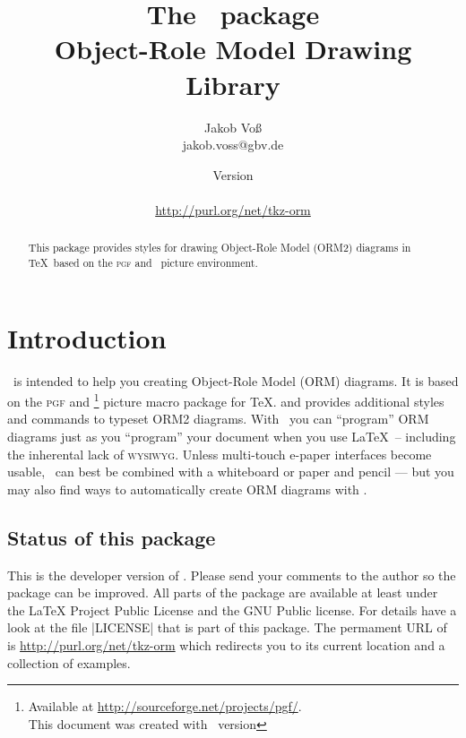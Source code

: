 \documentclass[a4paper,10pt]{article}
\title{The \tkzorm\ package\\Object-Role Model Drawing Library}
\author{Jakob Vo\ss\\{\footnotesize jakob.voss@gbv.de}}
\date{Version \ormVersion\\\ormDate\\[5mm]\url{http://purl.org/net/tkz-orm}}
\begin{document}
\maketitle

\begin{abstract}\noindent
This package provides styles for drawing Object-Role Model (ORM2) diagrams
in \TeX\ based on the \textsc{pgf} and \tikzname\ picture environment.
\end{abstract}

\tableofcontents
\pagebreak

\section{Introduction}
\label{sec:introduction}

\tkzorm\ is intended to help you creating Object-Role Model (ORM) diagrams. It is based on the \textsc{pgf} and \tikzname\footnote{Available at \url{http://sourceforge.net/projects/pgf/}.\\This document was created with \tikzname\ version \pgftypesetversion} picture macro package for \TeX. and provides additional styles and commands to typeset ORM2 diagrams. With \tkzorm\ you can ``program'' ORM diagrams just as you ``program'' your document when you use \LaTeX\ -- including the inherental lack of \textsc{wysiwyg}. Unless multi-touch e-paper interfaces become usable, \tkzorm\ can best be combined with a whiteboard or paper and pencil --- but you may also find ways to automatically create ORM diagrams with \tkzorm.

\subsection*{Status of this package}
This is the developer version of \tkzorm. Please send your comments to the author so the package can be improved. All parts of the package are available at least under the \LaTeX{} Project Public License\cite{LPPL} and the GNU Public license\cite{GPL2}. For details have a look at the file |LICENSE| that is part of this package. The permament URL of \tkzorm is \url{http://purl.org/net/tkz-orm} which redirects you to its current location and a collection of examples.
\end{document}
